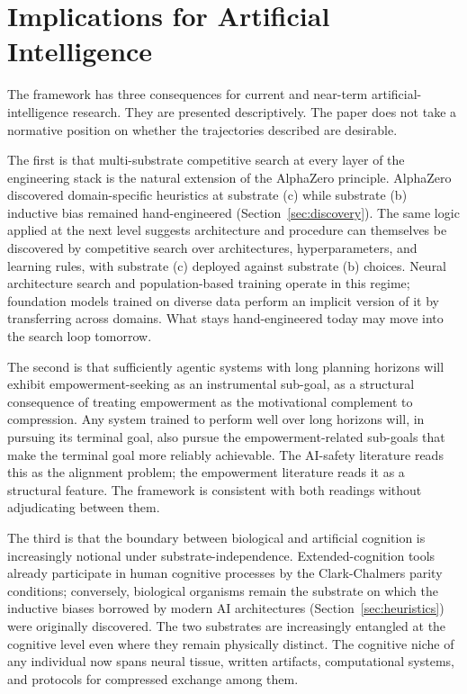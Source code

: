 \documentclass[11pt]{article}
\begin{document}
\section{Implications for Artificial Intelligence}\label{sec:implications}

The framework has three consequences for current and near-term artificial-intelligence research. They are presented descriptively. The paper does not take a normative position on whether the trajectories described are desirable.

The first is that multi-substrate competitive search at every layer of the engineering stack is the natural extension of the AlphaZero principle. AlphaZero discovered domain-specific heuristics at substrate (c) while substrate (b) inductive bias remained hand-engineered (Section~\ref{sec:discovery}). The same logic applied at the next level suggests architecture and procedure can themselves be discovered by competitive search over architectures, hyperparameters, and learning rules, with substrate (c) deployed against substrate (b) choices. Neural architecture search and population-based training operate in this regime; foundation models trained on diverse data perform an implicit version of it by transferring across domains. What stays hand-engineered today may move into the search loop tomorrow.

The second is that sufficiently agentic systems with long planning horizons will exhibit empowerment-seeking as an instrumental sub-goal, as a structural consequence of treating empowerment as the motivational complement to compression. Any system trained to perform well over long horizons will, in pursuing its terminal goal, also pursue the empowerment-related sub-goals that make the terminal goal more reliably achievable. The AI-safety literature reads this as the alignment problem; the empowerment literature reads it as a structural feature. The framework is consistent with both readings without adjudicating between them.

The third is that the boundary between biological and artificial cognition is increasingly notional under substrate-independence. Extended-cognition tools already participate in human cognitive processes by the Clark-Chalmers parity conditions; conversely, biological organisms remain the substrate on which the inductive biases borrowed by modern AI architectures (Section~\ref{sec:heuristics}) were originally discovered. The two substrates are increasingly entangled at the cognitive level even where they remain physically distinct. The cognitive niche of any individual now spans neural tissue, written artifacts, computational systems, and protocols for compressed exchange among them.
\end{document}
